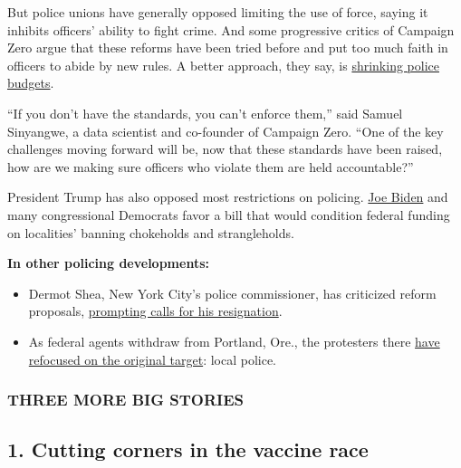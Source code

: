 But police unions have generally opposed limiting the use of force,
saying it inhibits officers' ability to fight crime. And some
progressive critics of Campaign Zero argue that these reforms have been
tried before and put too much faith in officers to abide by new rules. A
better approach, they say, is
\href{https://www.vice.com/en_us/article/ep4xy7/what-does-defund-and-abolish-the-police-mean}{shrinking
police budgets}.

``If you don't have the standards, you can't enforce them,'' said Samuel
Sinyangwe, a data scientist and co-founder of Campaign Zero. ``One of
the key challenges moving forward will be, now that these standards have
been raised, how are we making sure officers who violate them are held
accountable?''

President Trump has also opposed most restrictions on policing.
\href{https://www.usatoday.com/story/opinion/2020/06/10/biden-root-out-systemic-racism-not-just-divisive-trump-talk-column/5327631002/}{Joe
Biden} and many congressional Democrats favor a bill that would
condition federal funding on localities' banning chokeholds and
strangleholds.

\textbf{In other policing developments:}

\begin{itemize}
\item
  Dermot Shea, New York City's police commissioner, has criticized
  reform proposals,
  \href{https://www.nytimes.com/2020/08/03/nyregion/police-shea-de-blasio-nyc.html}{prompting
  calls for his resignation}.
\item
  As federal agents withdraw from Portland, Ore., the protesters there
  \href{https://www.nytimes.com/2020/08/02/us/portland-protests-.html}{have
  refocused on the original target}: local police.
\end{itemize}

\hypertarget{three-more-big-stories}{%
\subsubsection{\texorpdfstring{\textbf{THREE MORE BIG
STORIES}}{THREE MORE BIG STORIES}}\label{three-more-big-stories}}

\hypertarget{1-cutting-corners-in-the-vaccine-race}{%
\subsection{1. Cutting corners in the vaccine
race}\label{1-cutting-corners-in-the-vaccine-race}}

